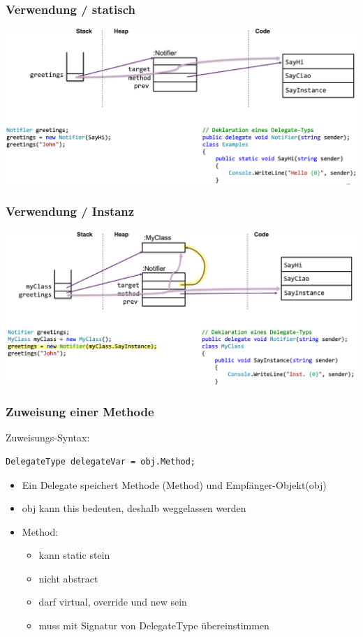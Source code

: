 \subsubsection{Verwendung / statisch}
\begin{center}
    \includegraphics[scale=.26]{graphic/delegate/statisch.png}
\end{center}
\vspace{-8pt}

\subsubsection{Verwendung / Instanz}
\begin{center}
    \includegraphics[scale=.26]{graphic/delegate/Instanz.png}
\end{center}
\vspace{-8pt}

\subsubsection{Zuweisung einer Methode}
Zuweisungs-Syntax:
\begin{lstlisting}
DelegateType delegateVar = obj.Method;
\end{lstlisting}

\begin{itemize}
    \item Ein Delegate speichert Methode (Method) und Empfänger-Objekt(obj)
    \item obj kann this bedeuten, deshalb weggelassen werden
    \item Method:
    \begin{itemize}
        \item kann static stein
        \item nicht abstract
        \item darf virtual, override und new sein
        \item muss mit Signatur von DelegateType übereinstimmen
    \end{itemize}
\end{itemize}


